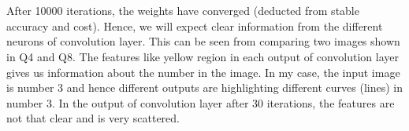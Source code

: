 \documentclass[fleqn]{article}
\begin{document}
\section{}
\begin{adjustwidth}{4em}{0pt}
	After 10000 iterations, the weights have converged (deducted from stable accuracy and cost). Hence, we will expect clear information from the different neurons of convolution layer. This can be seen from comparing two images shown in Q4 and Q8. The features like yellow region in each output of convolution layer gives us information about the number in the image. In my case, the input image is number 3 and hence different outputs are highlighting different curves (lines) in number 3. In the output of convolution layer after 30 iterations, the features are not that clear and is very scattered.\\ \\	
\end{adjustwidth}
\end{document}
